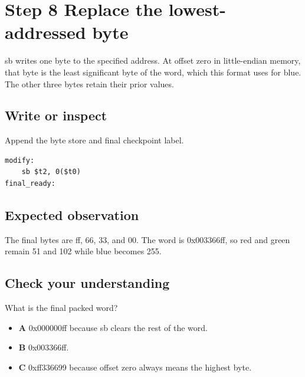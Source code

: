 \section{Step 8 Replace the lowest-addressed
  byte}\label{002-single-pixel-s08-step-8-replace-the-lowest-addressed-byte}

sb writes one byte to the specified address. At offset zero in
little-endian memory, that byte is the least significant byte of the
word, which this format uses for blue. The other three bytes retain
their prior values.

\subsection{Write or
  inspect}\label{002-single-pixel-s08-write-or-inspect}

Append the byte store and final checkpoint label.

\begin{verbatim}
modify:
    sb $t2, 0($t0)
final_ready:
\end{verbatim}

\subsection{Expected
  observation}\label{002-single-pixel-s08-expected-observation}

The final bytes are ff, 66, 33, and 00. The word is 0x003366ff, so red
and green remain 51 and 102 while blue becomes 255.

\subsection{Check your
  understanding}\label{002-single-pixel-s08-check-your-understanding}

What is the final packed word?

\begin{itemize}
  \tightlist
  \item
        \textbf{A} 0x000000ff because sb clears the rest of the word.
  \item
        \textbf{B} 0x003366ff.
  \item
        \textbf{C} 0xff336699 because offset zero always means the highest
        byte.
\end{itemize}

